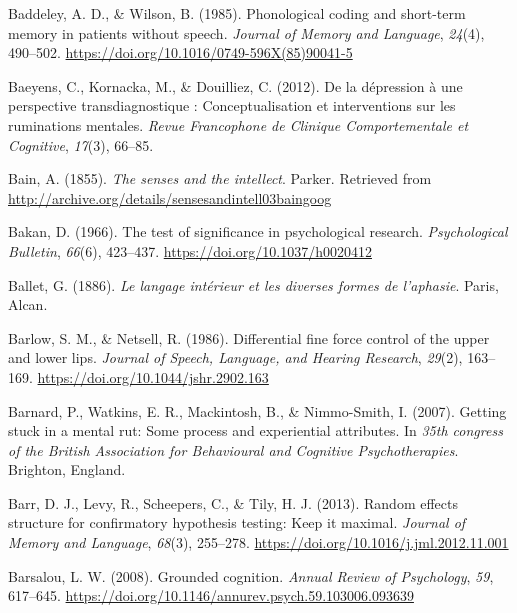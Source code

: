 \documentclass[a4paper,12pt,twoside,onecolumn,openright,final,oldfontcommands]{memoir}
\begin{document}
\leavevmode\hypertarget{ref-baddeley_phonological_1985}{}%
Baddeley, A. D., \& Wilson, B. (1985). Phonological coding and short-term memory in patients without speech. \emph{Journal of Memory and Language}, \emph{24}(4), 490--502. \url{https://doi.org/10.1016/0749-596X(85)90041-5}

\leavevmode\hypertarget{ref-Baeyens2012}{}%
Baeyens, C., Kornacka, M., \& Douilliez, C. (2012). De la dépression à une perspective transdiagnostique : Conceptualisation et interventions sur les ruminations mentales. \emph{Revue Francophone de Clinique Comportementale et Cognitive}, \emph{17}(3), 66--85.

\leavevmode\hypertarget{ref-bain_senses_1855}{}%
Bain, A. (1855). \emph{The senses and the intellect}. Parker. Retrieved from \url{http://archive.org/details/sensesandintell03baingoog}

\leavevmode\hypertarget{ref-bakan_test_1966}{}%
Bakan, D. (1966). The test of significance in psychological research. \emph{Psychological Bulletin}, \emph{66}(6), 423--437. \url{https://doi.org/10.1037/h0020412}

\leavevmode\hypertarget{ref-ballet_langage_1886}{}%
Ballet, G. (1886). \emph{Le langage intérieur et les diverses formes de l'aphasie}. Paris, Alcan.

\leavevmode\hypertarget{ref-barlow_differential_1986}{}%
Barlow, S. M., \& Netsell, R. (1986). Differential fine force control of the upper and lower lips. \emph{Journal of Speech, Language, and Hearing Research}, \emph{29}(2), 163--169. \url{https://doi.org/10.1044/jshr.2902.163}

\leavevmode\hypertarget{ref-barnard_getting_2007}{}%
Barnard, P., Watkins, E. R., Mackintosh, B., \& Nimmo-Smith, I. (2007). Getting stuck in a mental rut: Some process and experiential attributes. In \emph{35th congress of the British Association for Behavioural and Cognitive Psychotherapies}. Brighton, England.

\leavevmode\hypertarget{ref-barr_random_2013-1}{}%
Barr, D. J., Levy, R., Scheepers, C., \& Tily, H. J. (2013). Random effects structure for confirmatory hypothesis testing: Keep it maximal. \emph{Journal of Memory and Language}, \emph{68}(3), 255--278. \url{https://doi.org/10.1016/j.jml.2012.11.001}

\leavevmode\hypertarget{ref-Barsalou2008}{}%
Barsalou, L. W. (2008). Grounded cognition. \emph{Annual Review of Psychology}, \emph{59}, 617--645. \url{https://doi.org/10.1146/annurev.psych.59.103006.093639}
\end{document}
